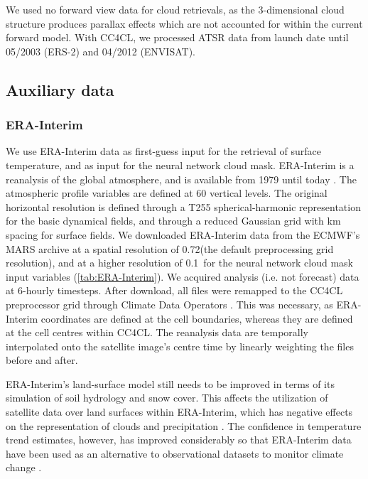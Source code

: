 We used no forward view data for cloud retrievals, as the 3-dimensional cloud structure produces parallax effects which are not accounted for within the current forward model. With CC4CL, we processed ATSR data from launch date until 05/2003 (ERS-2) and 04/2012 (ENVISAT). 

\subsection{Auxiliary data}

\subsubsection{ERA-Interim}\label{sec:ERA-Interim}

We use ERA-Interim data as first-guess input for the retrieval of surface temperature, and as input for the neural network cloud mask. ERA-Interim is a reanalysis of the global atmosphere, and is available from 1979 until today \citep{ERAInterim,Dee11}. The atmospheric profile variables are defined at 60 vertical levels. The original horizontal resolution is defined through a T255 spherical-harmonic representation for the basic dynamical fields, and through a reduced Gaussian grid with  km spacing for surface fields. We downloaded ERA-Interim data from the ECMWF's MARS archive at a spatial resolution of 0.72\textdegree (the default preprocessing grid resolution), and at a higher resolution of 0.1\textdegree\ for the neural network cloud mask input variables (\autoref{tab:ERA-Interim}). We acquired analysis (i.e. not forecast) data at 6-hourly timesteps. After download, all files were remapped to the CC4CL preprocessor grid through Climate Data Operators \citep{CDO15}. This was necessary, as ERA-Interim coordinates are defined at the cell boundaries, whereas they are defined at the cell centres within CC4CL. The reanalysis data are temporally interpolated onto the satellite image's centre time by linearly weighting the files before and after.

ERA-Interim's land-surface model still needs to be improved in terms of its simulation of soil hydrology and snow cover. This affects the utilization of satellite data over land surfaces within ERA-Interim, which has negative effects on the representation of clouds and precipitation \citep{ERAInterim}. The confidence in temperature trend estimates, however, has improved considerably so that ERA-Interim data have been used as an alternative to observational datasets to monitor climate change \citep{Willett10}.


